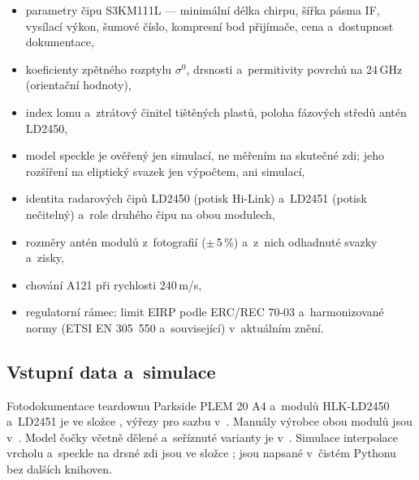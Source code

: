 \documentclass[czech]{skyren}
\begin{document}
\begin{itemize}
\item parametry čipu S3KM111L --- minimální délka chirpu, šířka pásma IF,
      vysílací výkon, šumové číslo, kompresní bod přijímače, cena
      a~dostupnost dokumentace,
\item koeficienty zpětného rozptylu $\sigma^0$, drsnosti a~permitivity
      povrchů na 24\,GHz (orientační hodnoty),
\item index lomu a~ztrátový činitel tištěných plastů, poloha fázových středů
      antén LD2450,
\item model speckle je ověřený jen simulací, ne měřením na skutečné zdi;
      jeho rozšíření na eliptický svazek jen výpočtem, ani simulací,
\item identita radarových čipů LD2450 (potisk Hi-Link) a~LD2451 (potisk
      nečitelný) a~role druhého čipu na obou modulech,
\item rozměry antén modulů z~fotografií ($\pm$\,5\,\%) a~z~nich odhadnuté
      svazky a~zisky,
\item chování A121 při rychlosti 240\,m/s,
\item regulatorní rámec: limit EIRP podle ERC/REC 70-03 a~harmonizované
      normy (ETSI EN 305~550 a~související) v~aktuálním znění.
\end{itemize}

\subsection{Vstupní data a~simulace}
Fotodokumentace teardownu Parkside PLEM 20 A4 a~modulů HLK-LD2450
a~LD2451 je ve složce , výřezy pro sazbu v~.
Manuály výrobce obou modulů jsou v~.
Model čočky včetně dělené a~seříznuté varianty je v~.
Simulace interpolace vrcholu a~speckle na drsné zdi jsou ve složce
; jsou napsané v~čistém Pythonu bez dalších knihoven.
\end{document}
